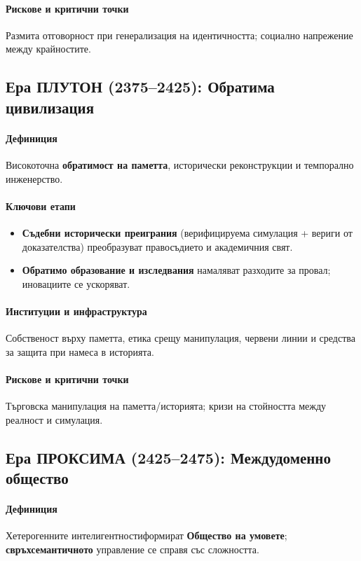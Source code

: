 \documentclass[11pt]{article}
\begin{document}
\paragraph{Рискове и критични точки} Размита отговорност при генерализация на идентичността; социално напрежение между крайностите.

\subsection{Ера ПЛУТОН (2375–2425): Обратима цивилизация}
\paragraph{Дефиниция} Високоточна \textbf{обратимост на паметта}, исторически реконструкции и темпорално инженерство.

\paragraph{Ключови етапи}
\begin{itemize}[noitemsep]
  \item \textbf{Съдебни исторически преиграния} (верифицируема симулация + вериги от доказателства) преобразуват правосъдието и академичния свят.
  \item \textbf{Обратимо образование и изследвания} намаляват разходите за провал; иновациите се ускоряват.
\end{itemize}

\paragraph{Институции и инфраструктура} Собственост върху паметта, етика срещу манипулация, червени линии и средства за защита при намеса в историята.

\paragraph{Рискове и критични точки} Търговска манипулация на паметта/историята; кризи на стойността между реалност и симулация.

\subsection{Ера ПРОКСИМА (2425–2475): Междудоменно общество}
\paragraph{Дефиниция} Хетерогенните интелигентностиформират \textbf{Общество на умовете}; \textbf{свръхсемантичното} управление се справя със сложността.
\end{document}
